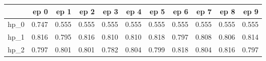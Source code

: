 \begin{tabular}{lrrrrrrrrrr}
\toprule
{} &   ep 0 &   ep 1 &   ep 2 &   ep 3 &   ep 4 &   ep 5 &   ep 6 &   ep 7 &   ep 8 &   ep 9 \\
\midrule
hp\_0 &  0.747 &  0.555 &  0.555 &  0.555 &  0.555 &  0.555 &  0.555 &  0.555 &  0.555 &  0.555 \\
hp\_1 &  0.816 &  0.795 &  0.816 &  0.810 &  0.810 &  0.818 &  0.797 &  0.808 &  0.806 &  0.814 \\
hp\_2 &  0.797 &  0.801 &  0.801 &  0.782 &  0.804 &  0.799 &  0.818 &  0.804 &  0.816 &  0.797 \\
\bottomrule
\end{tabular}
